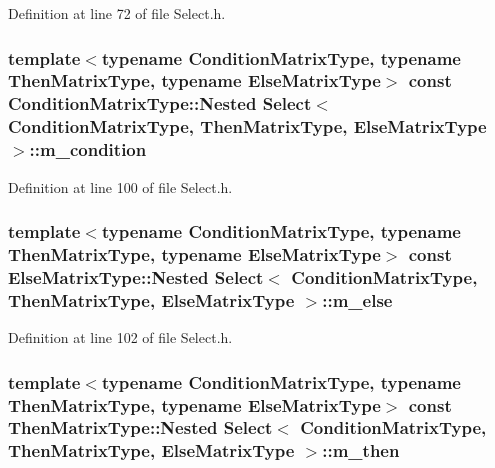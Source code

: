 Definition at line 72 of file Select.\-h.

\hypertarget{class_select_ad35af17d4ed987f568e6e3446d9a2e63}{
\subsubsection[{m\-\_\-condition}]{\setlength{\rightskip}{0pt plus 5cm}template$<$typename Condition\-Matrix\-Type, typename Then\-Matrix\-Type, typename Else\-Matrix\-Type$>$ const Condition\-Matrix\-Type\-::\-Nested {\bf Select}$<$ Condition\-Matrix\-Type, Then\-Matrix\-Type, Else\-Matrix\-Type $>$\-::m\-\_\-condition\hspace{0.3cm}{\ttfamily [protected]}}}\label{class_select_ad35af17d4ed987f568e6e3446d9a2e63}


Definition at line 100 of file Select.\-h.

\hypertarget{class_select_abc2605bc113454aa4b96426b96566f2a}{
\subsubsection[{m\-\_\-else}]{\setlength{\rightskip}{0pt plus 5cm}template$<$typename Condition\-Matrix\-Type, typename Then\-Matrix\-Type, typename Else\-Matrix\-Type$>$ const Else\-Matrix\-Type\-::\-Nested {\bf Select}$<$ Condition\-Matrix\-Type, Then\-Matrix\-Type, Else\-Matrix\-Type $>$\-::m\-\_\-else\hspace{0.3cm}{\ttfamily [protected]}}}\label{class_select_abc2605bc113454aa4b96426b96566f2a}


Definition at line 102 of file Select.\-h.

\hypertarget{class_select_a0c247b4da3434d0a2eee0cc46b0af4e1}{
\subsubsection[{m\-\_\-then}]{\setlength{\rightskip}{0pt plus 5cm}template$<$typename Condition\-Matrix\-Type, typename Then\-Matrix\-Type, typename Else\-Matrix\-Type$>$ const Then\-Matrix\-Type\-::\-Nested {\bf Select}$<$ Condition\-Matrix\-Type, Then\-Matrix\-Type, Else\-Matrix\-Type $>$\-::m\-\_\-then\hspace{0.3cm}{\ttfamily [protected]}}}\label{class_select_a0c247b4da3434d0a2eee0cc46b0af4e1}


